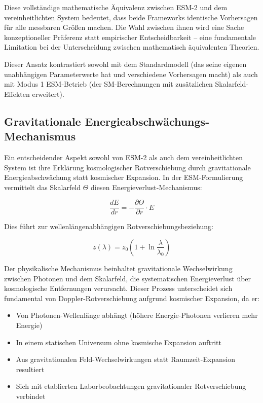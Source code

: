 	Diese vollständige mathematische Äquivalenz zwischen ESM-2 und dem vereinheitlichten System bedeutet, dass beide Frameworks identische Vorhersagen für alle messbaren Größen machen. Die Wahl zwischen ihnen wird eine Sache konzeptioneller Präferenz statt empirischer Entscheidbarkeit – eine fundamentale Limitation bei der Unterscheidung zwischen mathematisch äquivalenten Theorien.
	
	Dieser Ansatz kontrastiert sowohl mit dem Standardmodell (das seine eigenen unabhängigen Parameterwerte hat und verschiedene Vorhersagen macht) als auch mit Modus 1 ESM-Betrieb (der SM-Berechnungen mit zusätzlichen Skalarfeld-Effekten erweitert).
	
	\subsection{Gravitationale Energieabschwächungs-Mechanismus}
	\label{subsec:gravitational_energy_attenuation}
	
	Ein entscheidender Aspekt sowohl von ESM-2 als auch dem vereinheitlichten System ist ihre Erklärung kosmologischer Rotverschiebung durch gravitationale Energieabschwächung statt kosmischer Expansion. In der ESM-Formulierung vermittelt das Skalarfeld $\Theta$ diesen Energieverlust-Mechanismus:
	
	\begin{equation}
		\frac{dE}{dr} = -\frac{\partial \Theta}{\partial r} \cdot E
	\end{equation}
	
	Dies führt zur wellenlängenabhängigen Rotverschiebungsbeziehung:
	
	\begin{equation}
		z(\lambda) = z_0\left(1 + \ln\frac{\lambda}{\lambda_0}\right)
	\end{equation}
	
	Der physikalische Mechanismus beinhaltet gravitationale Wechselwirkung zwischen Photonen und dem Skalarfeld, die systematischen Energieverlust über kosmologische Entfernungen verursacht. Dieser Prozess unterscheidet sich fundamental von Doppler-Rotverschiebung aufgrund kosmischer Expansion, da er:
	
	\begin{itemize}
		\item Von Photonen-Wellenlänge abhängt (höhere Energie-Photonen verlieren mehr Energie)
		\item In einem statischen Universum ohne kosmische Expansion auftritt
		\item Aus gravitationalen Feld-Wechselwirkungen statt Raumzeit-Expansion resultiert
		\item Sich mit etablierten Laborbeobachtungen gravitationaler Rotverschiebung verbindet
	\end{itemize}
	
